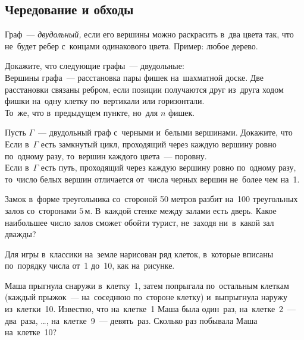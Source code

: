 \subsection*{Чередование и обходы}

Граф~— \emph{двудольный,} если его вершины можно раскрасить в~два цвета так,
что не~будет ребер с~концами одинакового цвета.
Пример: любое дерево.

\begin{problems}

\item
Докажите, что следующие графы~— двудольные:
\\
\subproblem
Вершины графа~— расстановка пары фишек на~шахматной доске.
Две расстановки связаны ребром, если позиции получаются друг из~друга ходом
фишки на~одну клетку по~вертикали или горизонтали.
\\
\subproblem
То~же, что в~предыдущем пункте, но~для $n$ фишек.

\item
Пусть $\Gamma$~— двудольный граф с~черными и~белыми вершинами.
Докажите, что
\\
\subproblem
Если в~$\Gamma$ есть замкнутый цикл, проходящий через каждую вершину ровно
по~одному разу, то~вершин каждого цвета~— поровну.
\\
\subproblem
Если в~$\Gamma$ есть путь, проходящий через каждую вершину ровно по~одному
разу, то~число белых вершин отличается от~числа черных вершин не~более чем
на~1.


\item
Замок в~форме треугольника со~стороной 50 метров разбит на~100 треугольных
залов со~сторонами $5\,\text{м}$.
В~каждой стенке между залами есть дверь.
Какое наибольшее число залов сможет обойти турист, не~заходя ни~в~какой зал
дважды?

\item
Для игры в~классики на~земле нарисован ряд клеток, в~которые вписаны по~порядку
числа от~1 до~10, как на~рисунке.
\begin{center}
\end{center}
Маша прыгнула снаружи в~клетку~1, затем попрыгала по~остальным клеткам
(каждый прыжок~— на~соседнюю по~стороне клетку) и~выпрыгнула наружу
из~клетки~10.
Известно, что на~клетке~1 Маша была один~раз, на~клетке~2~— два~раза, \ldots,
на~клетке~9~— девять~раз.
Сколько раз побывала Маша на~клетке~10?

\end{problems}


